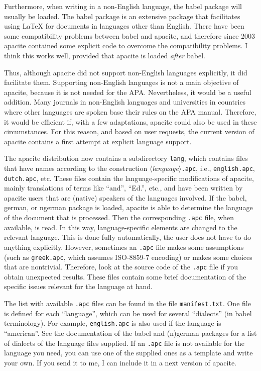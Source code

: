 \documentclass{article}
\newcommand{\pkg}[1]{\textsf{#1}}%
\newcommand{\fname}[1]{\texttt{#1}}%
\newcommand{\opt}[1]{$\langle${\itshape #1}$\rangle$}%
\begin{document}
Furthermore, when writing in a non-English language, the \pkg{babel} package
will usually be loaded. The \pkg{babel} package is an extensive package that
facilitates using \LaTeX{} for documents in languages other than English.
There have been some compatibility problems between \pkg{babel} and
\pkg{apacite}, and therefore since 2003 \pkg{apacite} contained some
explicit code to overcome the compatibility problems. I think this works
well, provided that \pkg{apacite} is loaded \emph{after} \pkg{babel}.

Thus, although \pkg{apacite} did not support non-English languages
explicitly, it did facilitate them. Supporting non-English languages is
not a main objective of \pkg{apacite}, because it is not needed for
the APA. Nevertheless, it would be a useful addition. Many journals in
non-English languages and universities in countries where other languages
are spoken base their rules on the APA manual. Therefore, it would be
efficient if, with a few adaptations, \pkg{apacite} could also be used in
these circumstances. For this reason, and based on user requests, the
current version of \pkg{apacite} contains a first attempt at explicit
language support.

The \pkg{apacite} distribution now contains a subdirectory \fname{lang},
which contains files that have names according to the construction
\opt{language}\fname{.apc}, i.e., \fname{english.apc}, \fname{dutch.apc}, etc.
These files contain the language-specific modifications of \pkg{apacite},
mainly translations of terms like ``and'', ``Ed.{}'', etc., and have been
written by \pkg{apacite} users that are (native) speakers of the languages
involved. If the \pkg{babel}, \pkg{german}, or \pkg{ngerman} package is
loaded, \pkg{apacite} is able to determine the language of the document that
is processed. Then the corresponding \fname{.apc} file, when available, is
read. In this way, language-specific elements are changed to the relevant
language. This is done fully automatically, the user does not have to do
anything explicitly. However, sometimes an \fname{.apc} file makes some
assumptions (such as \fname{greek.apc}, which assumes ISO-8859-7 encoding)
or makes some choices that are nontrivial. Therefore, look at the source
code of the \fname{.apc} file if you obtain unexpected results. These files
contain some brief documentation of the specific issues relevant for the
language at hand.

The list with available \fname{.apc} files can be found in the file
\fname{manifest.txt}. One file is defined for each ``language'', which can be
used for several ``dialects'' (in \pkg{babel} terminology). For example,
\fname{english.apc} is also used if the language is ``american''. See the
documentation of the \pkg{babel} and \pkg{(n)german} packages for a list of
dialects of the language files supplied. If an \fname{.apc} file is not
available for the language you need, you can use one of the supplied ones as a
template and write your own. If you send it to me, I can include it in a next
version of \pkg{apacite}.
\end{document}
